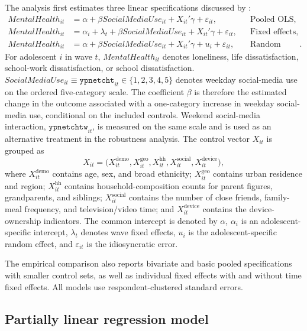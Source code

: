 \documentclass[11pt,oneside,a4paper]{book}
\begin{document}
The analysis first estimates three linear specifications discussed by \citet{ward1993pooled}:
\begin{align*}
MentalHealth_{it}
&=
\alpha
+ \beta SocialMediaUse_{it}
+ X_{it}'\gamma
+ \varepsilon_{it},
&& \text{Pooled OLS}, \\
MentalHealth_{it}
&=
\alpha_i
+ \lambda_t
+ \beta SocialMediaUse_{it}
+ X_{it}'\gamma
+ \varepsilon_{it},
&& \text{Fixed effects}, \\
MentalHealth_{it}
&=
\alpha
+ \beta SocialMediaUse_{it}
+ X_{it}'\gamma
+ u_i
+ \varepsilon_{it},
&& \text{Random effects}.
\end{align*}
For adolescent \(i\) in wave \(t\), \(MentalHealth_{it}\) denotes loneliness, life dissatisfaction, school-work dissatisfaction, or school dissatisfaction. \(SocialMediaUse_{it} \equiv \texttt{ypnetcht}_{it} \in \{1,2,3,4,5\}\) denotes weekday social-media use on the ordered five-category scale. The coefficient \(\beta\) is therefore the estimated change in the outcome associated with a one-category increase in weekday social-media use, conditional on the included controls. Weekend social-media interaction, \(\texttt{ypnetchtw}_{it}\), is measured on the same scale and is used as an alternative treatment in the robustness analysis. The control vector \(X_{it}\) is grouped as
\begin{equation*}
X_{it} = \bigl(X^{\text{demo}}_{it}, X^{\text{geo}}_{it}, X^{\text{hh}}_{it}, X^{\text{social}}_{it}, X^{\text{device}}_{it}\bigr),
\end{equation*}
where \(X^{\text{demo}}_{it}\) contains age, sex, and broad ethnicity; \(X^{\text{geo}}_{it}\) contains urban residence and region; \(X^{\text{hh}}_{it}\) contains household-composition counts for parent figures, grandparents, and siblings; \(X^{\text{social}}_{it}\) contains the number of close friends, family-meal frequency, and television/video time; and \(X^{\text{device}}_{it}\) contains the device-ownership indicators. The common intercept is denoted by \(\alpha\), \(\alpha_i\) is an adolescent-specific intercept, \(\lambda_t\) denotes wave fixed effects, \(u_i\) is the adolescent-specific random effect, and \(\varepsilon_{it}\) is the idiosyncratic error.

The empirical comparison also reports bivariate and basic pooled specifications with smaller control sets, as well as individual fixed effects with and without time fixed effects. All models use respondent-clustered standard errors.

\subsection[Partially Linear Regression Model]{Partially linear regression model}
\end{document}
